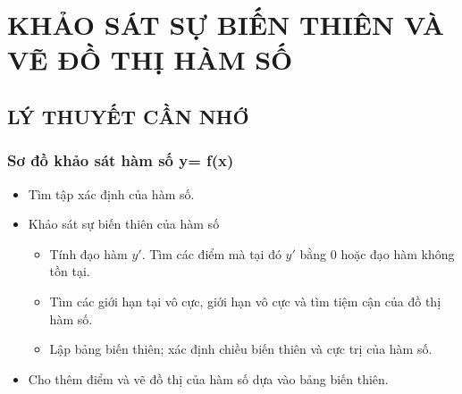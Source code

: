 \section{KHẢO SÁT SỰ BIẾN THIÊN VÀ VẼ ĐỒ THỊ HÀM SỐ}
\subsection{LÝ THUYẾT CẦN NHỚ}
\subsubsection{Sơ đồ khảo sát hàm số y= f(x)}
\begin{tcolorbox}[colframe=cyan,colback=red!3!white,boxrule=0.5mm]
		\begin{itemize}
		\item[\iconCH]  Tìm tập xác định của hàm số.
		\item [\iconCH]  Khảo sát sự biến thiên của hàm số
		\begin{itemize}
			\item Tính đạo hàm $y'$. Tìm các điểm mà tại đó $y'$ bằng $0$ hoặc đạo hàm không tồn tại.
			\item Tìm các giới hạn tại vô cực, giới hạn vô cực và tìm tiệm cận của đồ thị hàm số.
			\item Lập bảng biến thiên; xác định chiều biến thiên và cực trị của hàm số.
		\end{itemize}
		\item [\iconCH]  Cho thêm điểm và vẽ đồ thị của hàm số dựa vào bảng biến thiên.
	\end{itemize}
\end{tcolorbox}
